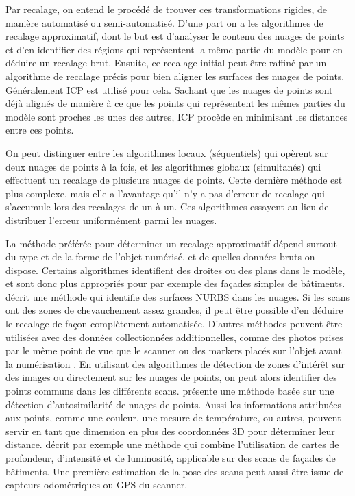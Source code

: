 \documentclass[a4paper,10pt]{scrreprt}
\begin{document}
Par recalage, on entend le procédé de trouver ces transformations rigides, de manière automatisé ou semi-automatisé. D'une part on a les algorithmes de recalage approximatif, dont le but est d'analyser le contenu des nuages de points et d'en identifier des régions qui représentent la même partie du modèle pour en déduire un recalage brut. Ensuite, ce recalage initial peut être raffiné par un algorithme de recalage précis pour bien aligner les surfaces des nuages de points. Généralement ICP est utilisé pour cela. Sachant que les nuages de points sont déjà alignés de manière à ce que les points qui représentent les mêmes parties du modèle sont proches les unes des autres, ICP procède en minimisant les distances entre ces points.

On peut distinguer entre les algorithmes locaux (séquentiels) qui opèrent sur deux nuages de points à la fois, et les algorithmes globaux (simultanés) qui effectuent un recalage de plusieurs nuages de points. Cette dernière méthode est plus complexe, mais elle a l'avantage qu'il n'y a pas d'erreur de recalage qui s'accumule lors des recalages de un à un. Ces algorithmes essayent au lieu de distribuer l'erreur uniformément parmi les nuages.

La méthode préférée pour déterminer un recalage approximatif dépend surtout du type et de la forme de l'objet numérisé, et de quelles données bruts on dispose. Certains algorithmes identifient des droites \cite{Lich2011} ou des plans \cite{Dold2006} dans le modèle, et sont donc plus appropriés pour par exemple des façades simples de bâtiments. \cite{Koch2008} décrit une méthode qui identifie des surfaces NURBS dans les nuages. Si les scans ont des zones de chevauchement assez grandes, il peut être possible d'en déduire le recalage de façon complètement automatisée. D'autres méthodes peuvent être utilisées avec des données collectionnées additionnelles, comme des photos prises par le même point de vue que le scanner \cite{Tour2009} ou des markers placés sur l'objet avant la numérisation \cite{Mati2011}. En utilisant des algorithmes de détection de zones d'intérêt \cite{Tuyt2007} sur des images ou directement sur les nuages de points, on peut alors identifier des points communs dans les différents scans. \cite{Huan2012} présente une méthode basée sur une détection d'autosimilarité de nuages de points. Aussi les informations attribuées aux points, comme une couleur, une mesure de température, ou autres, peuvent servir en tant que dimension en plus des coordonnées 3D pour déterminer leur distance. \cite{Wend2008} décrit par exemple une méthode qui combine l'utilisation de cartes de profondeur, d'intensité et de luminosité, applicable sur des scans de façades de bâtiments. Une première estimation de la pose des scans peut aussi être issue de capteurs odométriques ou GPS du scanner.
\end{document}
